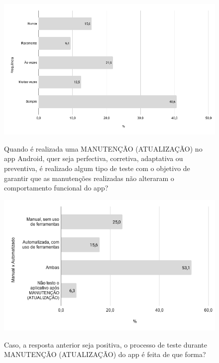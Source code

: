     
        \begin{figure}[!htb]
        \centering
        \includegraphics[width=.80\textwidth]{images/s_testemanutencao.png}
        \label{figure:s_testemanutencao}
        \caption{Quando é realizada uma MANUTENÇÃO (ATUALIZAÇÃO) no app Android, quer seja perfectiva, corretiva, adaptativa ou preventiva, é realizado algum tipo de teste com o objetivo de garantir que as manutenções realizadas não alteraram o comportamento funcional do app?}
        \end{figure}   
    
    
        \begin{figure}[!htb]
        \centering
        \includegraphics[width=.80\textwidth]{images/s_formatestemanutencao.png}
        \label{figure:s_formatestemanutencao}
        \caption{Caso, a resposta anterior seja positiva, o processo de teste durante MANUTENÇÃO (ATUALIZAÇÃO) do app é feita de que forma?}
        \end{figure}     
    
